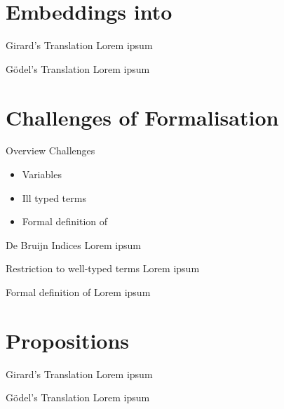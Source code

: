 \documentclass{beamer}
\theoremstyle{definition}
\begin{document}
  \section{\texorpdfstring{Embeddings into \lab}{Embeddings into the boxed lambda calculus}}
  \begin{frame}{Girard's Translation}
    Lorem ipsum
  \end{frame}
  \begin{frame}{Gödel's Translation}
    Lorem ipsum
  \end{frame}

  \section{Challenges of Formalisation}
  \begin{frame}{Overview Challenges}
    \begin{itemize}
      \item[\textbullet] Variables
      \item[\textbullet] Ill typed terms
      \item[\textbullet] Formal definition of \raiseembn
    \end{itemize}
  \end{frame}
  \begin{frame}{De Bruijn Indices}
    Lorem ipsum
  \end{frame}
  \begin{frame}{Restriction to well-typed terms}
    Lorem ipsum
  \end{frame}
  \begin{frame}{Formal definition of \raiseembn}
    Lorem ipsum
  \end{frame}

  \section{Propositions}
  \begin{frame}{Girard's Translation}
    Lorem ipsum
  \end{frame}
  \begin{frame}{Gödel's Translation}
    Lorem ipsum
  \end{frame}
\end{document}

